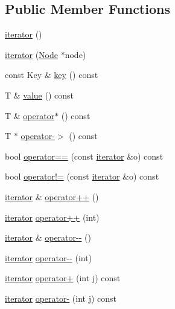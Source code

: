 \subsection*{Public Member Functions}
\begin{DoxyCompactItemize}
\item 
\hyperlink{class_q_map_1_1iterator_ac7abc795f672ac4049726570ba460c87}{iterator} ()
\item 
\hyperlink{class_q_map_1_1iterator_a3c0ef7bb43edd14e972bcf9649b5649d}{iterator} (\hyperlink{struct_q_map_node}{Node} $\ast$node)
\item 
const Key \& \hyperlink{class_q_map_1_1iterator_af0dfe1fb8fe0c14b209b42f836ef2ee4}{key} () const 
\item 
T \& \hyperlink{class_q_map_1_1iterator_add56d9970fa4c0bb2ffa84fb95a4aa46}{value} () const 
\item 
T \& \hyperlink{class_q_map_1_1iterator_a026751b88c480310a7dfc08c7edc1b16}{operator$\ast$} () const 
\item 
T $\ast$ \hyperlink{class_q_map_1_1iterator_a2bd3c3b35f5d78bb1870c846cdc566d1}{operator-\/$>$} () const 
\item 
bool \hyperlink{class_q_map_1_1iterator_a934510c8ca578b3659b2e91481dd5915}{operator==} (const \hyperlink{class_q_map_1_1iterator}{iterator} \&o) const 
\item 
bool \hyperlink{class_q_map_1_1iterator_a580abd11bf77a6ff8c2cf66c31dac35b}{operator!=} (const \hyperlink{class_q_map_1_1iterator}{iterator} \&o) const 
\item 
\hyperlink{class_q_map_1_1iterator}{iterator} \& \hyperlink{class_q_map_1_1iterator_a119ae3335f65b9d40af561352530e5b8}{operator++} ()
\item 
\hyperlink{class_q_map_1_1iterator}{iterator} \hyperlink{class_q_map_1_1iterator_a9a7434d417ace45b1e55768e2e76f8e3}{operator++} (int)
\item 
\hyperlink{class_q_map_1_1iterator}{iterator} \& \hyperlink{class_q_map_1_1iterator_a9f8068b336d1572a914c4c55d57fc174}{operator-\/-\/} ()
\item 
\hyperlink{class_q_map_1_1iterator}{iterator} \hyperlink{class_q_map_1_1iterator_ac9d9b8e0632050e007466efb2a0764c8}{operator-\/-\/} (int)
\item 
\hyperlink{class_q_map_1_1iterator}{iterator} \hyperlink{class_q_map_1_1iterator_a771aee188731919b54f1dd8e39c2a9cd}{operator+} (int j) const 
\item 
\hyperlink{class_q_map_1_1iterator}{iterator} \hyperlink{class_q_map_1_1iterator_a367af4b10d274f42dfe5b185cf775376}{operator-\/} (int j) const 

\end{DoxyCompactItemize}
